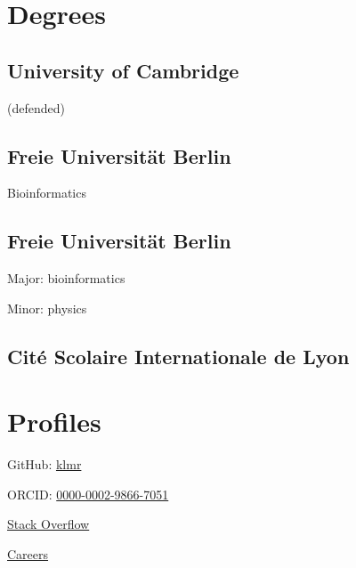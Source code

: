 \documentclass{klmr-cv}
\author{Konrad Rudolph}
\begin{document}
\maketitle

\sidebar

\section{Degrees}

\subsection{University of Cambridge}

\date{2015}
\item{ (defended)}

\subsection{Freie Universität Berlin}

\date{2011}
\item{}
\item{Bioinformatics}

\subsection{Freie Universität Berlin}

\date{2008}
\item{}
\item{Major: bioinformatics}
\item{Minor: physics}

\subsection{\textfrench{Cité Scolaire Internationale de Lyon}}

\date{2003}
\item{}

\section{Profiles}

\item{GitHub: \href{http://github.com/klmr}{klmr}}
\item{ORCID: \href{http://orcid.org/0000-0002-9866-7051}{0000-0002-9866-7051}}
\item{\href{http://stackoverflow.com/users/1968/konrad-rudolph}{Stack Overflow}}
\item{\href{http://careers.stackoverflow.com/klmr}{Careers}}
\end{document}

